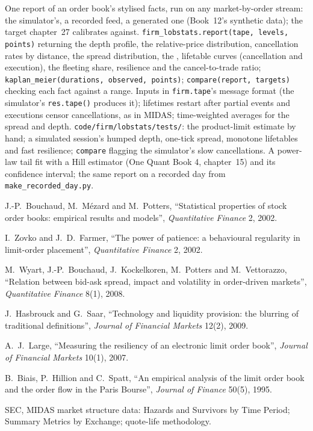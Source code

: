 \begin{build}
 One report of an order book's stylised facts, run on any market-by-order stream: the simulator's, a recorded feed, a generated one
(Book~12's synthetic data); the target chapter~27 calibrates against.
 \texttt{firm\_lobstats.report(tape, levels, points)} returning the depth profile, the relative-price distribution,
cancellation rates by distance, the spread distribution, the , lifetable curves (cancellation and execution), the fleeting share,
resilience and the cancel-to-trade ratio; \texttt{kaplan\_meier(durations, observed, points)}; \texttt{compare(report, targets)} checking each fact
against a range.
 Inputs in \texttt{firm.tape}'s message format (the simulator's \texttt{res.tape()} produces it); lifetimes restart after partial events and
executions censor cancellations, as in MIDAS; time-weighted averages for the spread and depth.
 \texttt{code/firm/lobstats/tests/}: the product-limit estimate by hand; a simulated session's humped depth, one-tick spread,
monotone lifetables and fast resilience; \texttt{compare} flagging the simulator's slow cancellations.
 A power-law tail fit with a Hill estimator (One Quant Book 4, chapter~15) and its confidence interval; the same report on a recorded
day from \texttt{make\_recorded\_day.py}.
\end{build}

\begin{omsources}
\item J.-P.~Bouchaud, M.~Mézard and M.~Potters, ``Statistical properties of stock order books: empirical results and models'', \emph{Quantitative
Finance} 2, 2002.
\item I.~Zovko and J.~D.~Farmer, ``The power of patience: a behavioural regularity in limit-order placement'', \emph{Quantitative Finance} 2, 2002.
\item M.~Wyart, J.-P.~Bouchaud, J.~Kockelkoren, M.~Potters and M.~Vettorazzo, ``Relation between bid-ask spread, impact and volatility in order-driven
markets'', \emph{Quantitative Finance} 8(1), 2008.
\item J.~Hasbrouck and G.~Saar, ``Technology and liquidity provision: the blurring of traditional definitions'', \emph{Journal of Financial Markets}
12(2), 2009.
\item A.~J.~Large, ``Measuring the resiliency of an electronic limit order book'', \emph{Journal of Financial Markets} 10(1), 2007.
\item B.~Biais, P.~Hillion and C.~Spatt, ``An empirical analysis of the limit order book and the order flow in the Paris Bourse'', \emph{Journal of
Finance} 50(5), 1995.
\item SEC, MIDAS market structure data: Hazards and Survivors by Time Period; Summary Metrics by Exchange; quote-life methodology.
\end{omsources}

